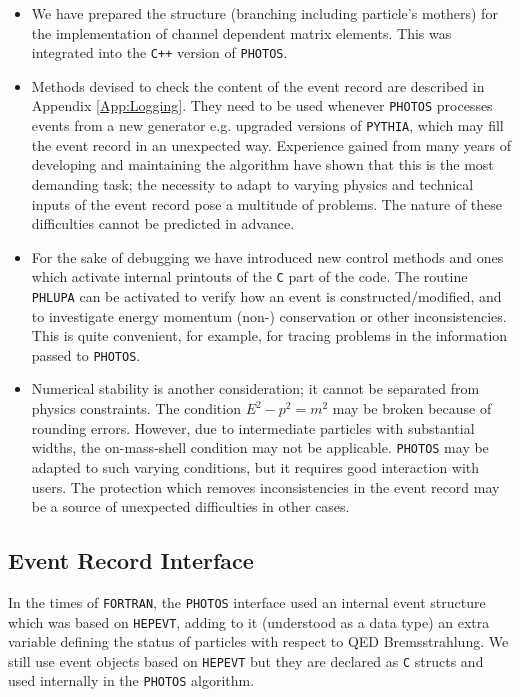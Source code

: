 \documentclass[]{Photos_interface_design}
\begin{document}
\begin{itemize}


\item
We have prepared the structure (branching including particle's mothers)  
for the implementation of channel dependent matrix elements. This was   
integrated into the {\tt C++} version of {\tt PHOTOS}. 

\item
Methods devised to check the content of the event record are described in Appendix \ref{App:Logging}. 
They need to be used whenever {\tt PHOTOS} 
processes events from a new generator e.g. upgraded versions of  {\tt PYTHIA},
which may fill the event record in an unexpected way.
Experience gained from many years of developing and maintaining the algorithm
have shown that this is the most demanding task; the necessity to
adapt to varying physics and technical inputs of the event record pose
a multitude of problems. The nature of these difficulties cannot be
predicted in advance. 

\item
For the sake of debugging we have introduced new control methods 
and ones which activate
internal printouts of the {\tt C} part of the code.
The routine {\tt PHLUPA} \cite{Barberio:1993qi} can be activated  to verify 
how an event is constructed/modified, and to investigate energy 
momentum (non-) conservation or other inconsistencies.
This is quite convenient, for example, for tracing problems in the
information passed to {\tt PHOTOS}.


\item
Numerical stability is another consideration; it cannot be separated from
physics constraints. The condition  $E^2-p^2=m^2$ may be broken  because of 
rounding errors.  However, due to intermediate particles with
  substantial widths, the on-mass-shell condition may not be applicable.
{\tt PHOTOS} may be adapted to such varying conditions, but it requires
good interaction with users. The protection which removes 
inconsistencies in the event record may be a source of unexpected difficulties
in other cases. 
\end{itemize}

 
\subsection{Event Record Interface}
In the times of {\tt FORTRAN}, the {\tt PHOTOS} interface used an internal event structure which was
based on {\tt HEPEVT},
adding to it (understood as a data type) an extra variable defining 
the status of particles with respect to QED Bremsstrahlung. We still use event objects based on {\tt HEPEVT} 
but they are declared as {\tt C} structs and used internally in the {\tt PHOTOS} algorithm.
\end{document}
